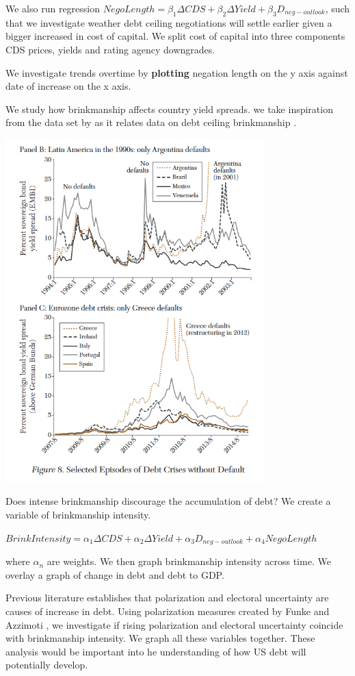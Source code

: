 \documentclass[
  12pt]{article}
\begin{document}
We also run regression
\(NegoLength=\beta_1\Delta CDS+\beta_2\Delta Yield+\beta_3D_{neg-outlook}\),
such that we investigate weather debt ceiling negotiations will settle
earlier given a bigger increased in cost of capital. We split cost of
capital into three components CDS prices, yields and rating agency
downgrades.

We investigate trends overtime by \textbf{plotting} negation length on
the y axis against date of increase on the x axis.

We study how brinkmanship affects country yield spreads. we take
inspiration from the data set by \citep{meyer2022} as it relates data on
debt ceiling brinkmanship \citep{reinhart2008}.

\includegraphics[width=3.94792in,height=\textheight]{style-guide/overtime_brink_2.png}

Does intense brinkmanship discourage the accumulation of debt? We create
a variable of brinkmanship intensity.

\(BrinkIntensity=\alpha_1\Delta CDS+\alpha_2\Delta Yield+\alpha_3D_{neg-outlook}+\alpha_4NegoLength\)

where \(\alpha_n\) are weights. We then graph brinkmanship intensity
across time. We overlay a graph of change in debt and debt to GDP.

Previous literature establishes that polarization and electoral
uncertainty are causes of increase in debt. Using polarization measures
created by Funke and Azzimoti \citep{funke2016, azzimonti2018}, we
investigate if rising polarization and electoral uncertainty coincide
with brinkmanship intensity. We graph all these variables together.
These analysis would be important into he understanding of how US debt
will potentially develop.
\end{document}
